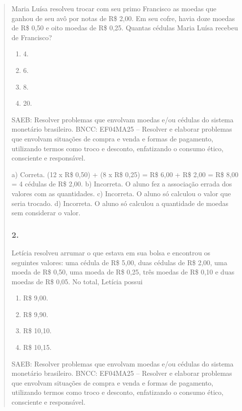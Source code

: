 \begin{enumerate}
\begin{escolha}
\begin{enumerate}
\begin{itemize}
\begin{itemize}
\begin{escolha}
\begin{quote}
\begin{escolha}
Maria Luísa resolveu trocar com seu primo Francisco as moedas que ganhou de seu avô por notas de
R\$ 2,00. Em seu cofre, havia doze moedas de R\$ 0,50
e oito moedas de R\$ 0,25. Quantas cédulas Maria Luísa recebeu de Francisco?

\begin{enumerate}
\def\labelenumi{\alph{enumi})}
\item
  4.
\item
  6.
\item
  8.
\item
  20.
\end{enumerate}

SAEB: Resolver problemas que envolvam moedas e/ou cédulas do sistema monetário brasileiro.
BNCC: EF04MA25 -- Resolver e elaborar problemas que envolvam situações de compra e venda e formas
de pagamento, utilizando termos como troco e desconto, enfatizando o consumo ético, consciente e
responsável.

a) Correta. (12 x R\$ 0,50) + (8 x R\$ 0,25) = R\$ 6,00 + R\$ 2,00 = R\$ 8,00 = 4 cédulas de R\$ 2,00.
b) Incorreta. O aluno fez a associação errada dos valores com as quantidades.
c) Incorreta. O aluno só calculou o valor que seria trocado.
d) Incorreta. O aluno só calculou a quantidade de moedas sem considerar o valor.


\subsubsection{2.}\label{section-76}

Letícia resolveu arrumar o que estava em sua bolsa e encontrou
os seguintes valores: uma cédula de R\$ 5,00, duas cédulas de R\$ 2,00, uma moeda de R\$ 0,50, uma moeda de R\$ 0,25, três moedas de R\$ 0,10 e duas moedas de R\$ 0,05. No total, Letícia possui

\begin{enumerate}
\def\labelenumi{\alph{enumi})}
\item
  R\$ 9,00.
\item
  R\$ 9,90.
\item
  R\$ 10,10.
\item
  R\$ 10,15.
\end{enumerate}

SAEB: Resolver problemas que envolvam moedas e/ou cédulas do sistema monetário brasileiro.
BNCC: EF04MA25 -- Resolver e elaborar problemas que envolvam situações de compra e venda e formas
de pagamento, utilizando termos como troco e desconto, enfatizando o consumo ético, consciente e
responsável.


\end{escolha}
\end{quote}
\end{escolha}
\end{itemize}
\end{itemize}
\end{enumerate}
\end{escolha}
\end{enumerate}
